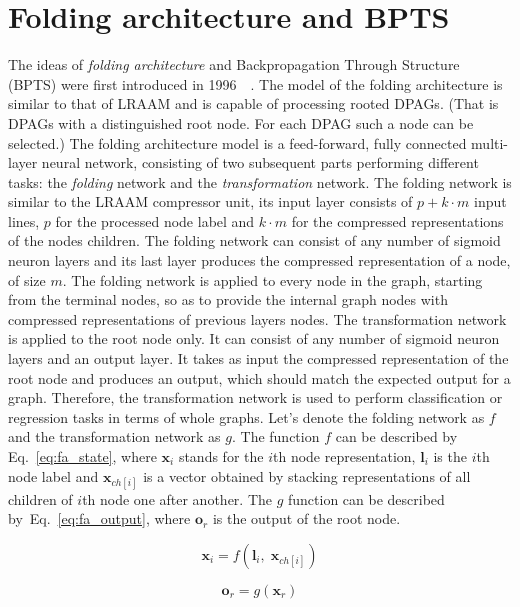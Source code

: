 \section{Folding architecture and BPTS}
The ideas of \emph{folding architecture} and Backpropagation Through Structure (BPTS) were first introduced in 1996~\cite{goller1996learning}~\cite{kuchler1996inductive}. The model of the folding architecture is similar to that of LRAAM and is capable of processing rooted DPAGs. (That is DPAGs with a distinguished root node. For each DPAG such a node can be selected.) The folding architecture model is a feed-forward, fully connected multi-layer neural network, consisting of two subsequent parts performing different tasks: the \emph{folding} network and the \emph{transformation} network. The folding network is similar to the LRAAM compressor unit, its input layer consists of $p + k \cdot m$ input lines, $p$ for the processed node label and $k \cdot m$ for the compressed representations of the nodes children. The folding network can consist of any number of sigmoid neuron layers and its last layer produces the compressed representation of a node, of size $m$. The folding network is applied to every node in the graph, starting from the terminal nodes, so as to provide the internal graph nodes with compressed representations of previous layers nodes. The transformation network is applied to the root node only. It can consist of any number of sigmoid neuron layers and an output layer. It takes as input the compressed representation of the root node and produces an output, which should match the expected output for a graph. Therefore, the transformation network is used to perform classification or regression tasks in terms of whole graphs. Let's denote the folding network as $f$ and the transformation network as $g$. The function $f$ can be described by Eq.~\ref{eq:fa_state}, where $\bm{x}_i$ stands for the $i$th node representation, $\bm{l}_i$ is the $i$th node label and $\bm{x}_{ch[i]}$ is a vector obtained by stacking representations of all children of $i$th node one after another. The $g$ function can be described by~Eq.~\ref{eq:fa_output}, where $\bm{o}_r$ is the output of the root node.

\begin{equation}
\bm{x}_i = f(\bm{l}_i, \; \bm{x}_{ch[i]})
\label{eq:fa_state}
\end{equation}

\begin{equation}
\bm{o}_r = g(\bm{x}_r)
\label{eq:fa_output}
\end{equation}

